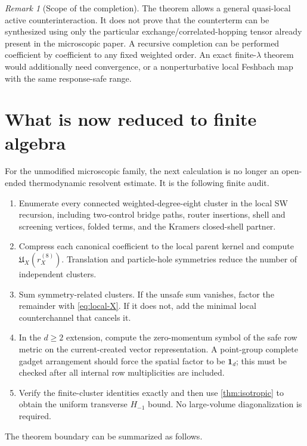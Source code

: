 \documentclass[11pt]{article}
\theoremstyle{definition}
\theoremstyle{remark}
\newtheorem{remark}[theorem]{Remark}
\newcommand{\Id}{\mathbf 1}
\begin{document}
\begin{remark}[Scope of the completion]
The theorem allows a general quasi-local active counterinteraction.  It does
not prove that the counterterm can be synthesized using only the particular
exchange/correlated-hopping tensor already present in the microscopic paper.
A recursive completion can be performed coefficient by coefficient to any
fixed weighted order.  An exact finite-$\lambda$ theorem would additionally
need convergence, or a nonperturbative local Feshbach map with the same
response-safe range.
\end{remark}

\section{What is now reduced to finite algebra}
\label{sec:program}

For the unmodified microscopic family, the next calculation is no longer an
open-ended thermodynamic resolvent estimate.  It is the following finite audit.

\begin{enumerate}
\item Enumerate every connected weighted-degree-eight cluster in the local SW
recursion, including two-control bridge paths, router insertions, shell and
screening vertices, folded terms, and the Kramers closed-shell partner.
\item Compress each canonical coefficient to the local parent kernel and
compute $\mathfrak U_X(r_X^{(8)})$.  Translation and particle-hole symmetries
reduce the number of independent clusters.
\item Sum symmetry-related clusters.  If the unsafe sum vanishes, factor the
remainder with \eqref{eq:local-X}.  If it does not, add the minimal local
counterchannel that cancels it.
\item In the $d\ge2$ extension, compute the zero-momentum symbol of the safe
row metric on the current-created vector representation.  A point-group
complete gadget arrangement should force the spatial factor to be $\Id_d$;
this must be checked after all internal row multiplicities are included.
\item Verify the finite-cluster identities exactly and then use
\cref{thm:isotropic} to obtain the uniform transverse $H_{-1}$ bound.  No
large-volume diagonalization is required.
\end{enumerate}

The theorem boundary can be summarized as follows.
\end{document}
